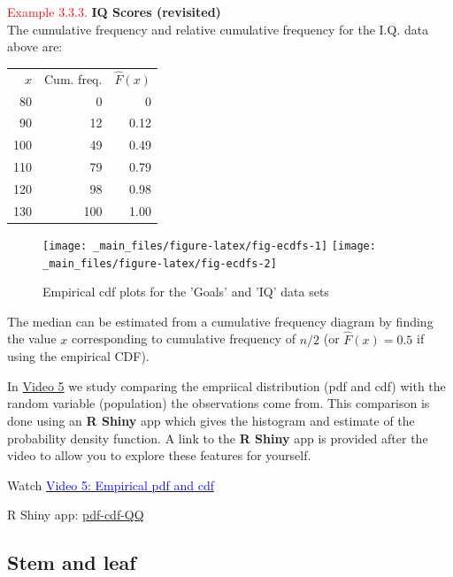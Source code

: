 \documentclass[
]{book}
\begin{document}
\newpage

\leavevmode{}%
\textcolor{red}{Example 3.3.3.}
{ \textbf{IQ Scores (revisited)} }\\
The cumulative frequency and relative cumulative
frequency for the I.Q. data above are:

\begin{longtable}[]{@{}rrr@{}}
\toprule\noalign{}
\endhead
\bottomrule\noalign{}
\endlastfoot
\(x\) & Cum. freq. & \(\hat F(x)\) \\
80 & 0 & 0 \\
90 & 12 & 0.12 \\
100 & 49 & 0.49 \\
110 & 79 & 0.79 \\
120 & 98 & 0.98 \\
130 & 100 & 1.00 \\
\end{longtable}

\begin{figure}
\texttt{[image: \_main\_files/figure-latex/fig-ecdfs-1]} \texttt{[image: \_main\_files/figure-latex/fig-ecdfs-2]} \caption{Empirical cdf plots for the 'Goals' and 'IQ' data sets}\label{fig:fig-ecdfs}
\end{figure}

The median can be estimated from a cumulative frequency diagram by
finding the value \(x\) corresponding to cumulative frequency of \(n/2\) (or
\(\hat F(x) = 0.5\) if using the empirical CDF).

In \protect\hyperlink{video5}{Video 5} we study comparing the empriical distribution (pdf and cdf) with the random variable (population) the observations come from. This comparison is done using an \textbf{R Shiny} app which gives the histogram and estimate of the probability density function. A link to the \textbf{R Shiny} app is provided after the video to allow you to explore these features for yourself.

Watch \href{https://mediaspace.nottingham.ac.uk/media/Empirical+PDF+and+CDF+FINAL+VERSION/1_ge0o82fd}{\textcolor{blue}{Video 5: Empirical pdf and cdf}}

R Shiny app: \href{https://shiny-new.maths.nottingham.ac.uk/pmzpn/pdf_cdf_QQ/}{pdf-cdf-QQ}

\hypertarget{visual_plot_stem}{%
\subsection{\texorpdfstring{{\textbf{Stem and leaf}}}{Stem and leaf}}\label{visual_plot_stem}}
\end{document}

